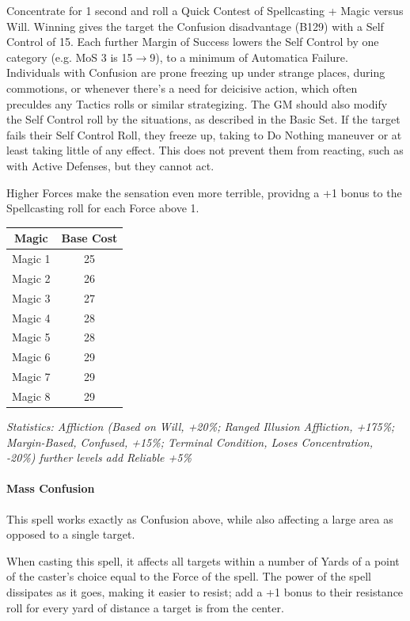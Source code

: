 \begin{multicols*}{3}
	Concentrate for 1 second and roll a Quick Contest of Spellcasting + Magic versus Will. Winning gives the target the Confusion disadvantage (B129) with a Self Control of 15. Each further Margin of Success lowers the Self Control by one category (e.g. MoS 3 is 15$\rightarrow$9), to a minimum of Automatica Failure. Individuals with Confusion are prone freezing up under strange places, during commotions, or whenever there's a need for deicisive action, which often preculdes any Tactics rolls or similar strategizing. The GM should also modify the Self Control roll by the situations, as described in the Basic Set. If the target fails their Self Control Roll, they freeze up, taking to Do Nothing maneuver or at least taking little of any effect. This does not prevent them from reacting, such as with Active Defenses, but they cannot act.
	
	Higher Forces make the sensation even more terrible, providng a +1 bonus to the Spellcasting roll for each Force above 1.
	
	\begin{center}
		\begin{tabular}{|c|c|}
			\hline
			Magic & Base Cost \\
			\hline
			\hline
			Magic 1 & 25 \\
			Magic 2 & 26 \\
			Magic 3 & 27 \\
			Magic 4 & 28 \\
			Magic 5 & 28 \\
			Magic 6 & 29 \\
			Magic 7 & 29 \\
			Magic 8 & 29 \\
			\hline
		\end{tabular}
	\end{center}

	\textcolor{OliveGreen}{\textit{Statistics: Affliction (Based on Will, +20\%; Ranged Illusion Affliction, +175\%; Margin-Based, Confused, +15\%; Terminal Condition, Loses Concentration, -20\%)  further levels add Reliable +5\%}}
	
	\paragraph{Mass Confusion}
	
	This spell works exactly as Confusion above, while also affecting a large area as opposed to a single target.
	
	When casting this spell, it affects all targets within a number of Yards of a point of the caster's choice equal to the Force of the spell. The power of the spell dissipates as it goes, making it easier to resist; add a +1 bonus to their resistance roll for every yard of distance a target is from the center.
	

\end{multicols*}
